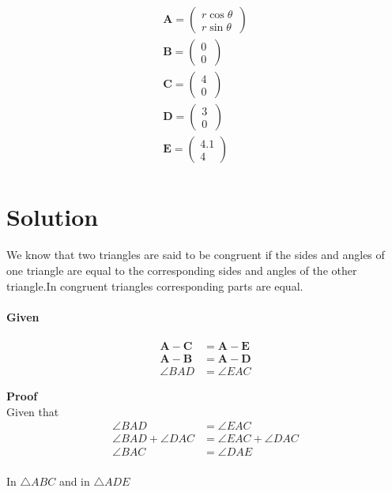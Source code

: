 \documentclass[10pt,a4paper]{article}
\let\vec\mathbf
\begin{document}
\begin{align*}
\vec{A}=\begin{pmatrix} r\cos\theta\\ r\sin\theta\ \end{pmatrix} \\
\vec{B}=\begin{pmatrix} 0\\ 0\ \end{pmatrix} \\
\vec{C}=\begin{pmatrix} 4\\ 0\ \end{pmatrix} \\
\vec{D}=\begin{pmatrix} 3\\ 0\ \end{pmatrix} \\
\vec{E}=\begin{pmatrix} 4.1\\ 4\ \end{pmatrix} \\
\end{align*}

\section{Solution}
 We know that two triangles are  said to be congruent if the sides and angles of one
triangle are equal to the corresponding sides and angles of the other triangle.In congruent triangles corresponding parts are equal.

\paragraph{Given}
\begin{align}
\vec{A}-\vec{C} &=\vec{A}-\vec{E} \\
\vec{A}-\vec{B} &=\vec{A}-\vec{D}\\
\angle BAD &=\angle EAC
\end{align}
	

\textbf{Proof}\\
Given that
\begin{align*}
\angle BAD &=\angle EAC\\
\angle BAD+\angle DAC &=\angle EAC+\angle DAC\\
\angle BAC &=\angle DAE\\
\end{align*}


In $\triangle ABC $ and in $\triangle ADE$
\end{document}

